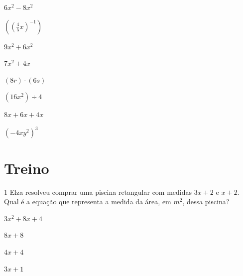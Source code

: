 \begin{multicols}{2}
\begin{escolha}[itemsep=0pt,leftmargin=0pt]
\item $6x^2 - 8x^2$
\item $((\frac{4}{5}x)^{-1})$
\item $9x^2 + 6x^2$
\item $7x^2 + 4x$
\item $(8r) \cdot (6s)$
\item $(16x^2) \div 4$
\item $8x + 6x + 4x$
\item $(-4xy^2)^3$
\end{escolha}
\end{multicols}


\section*{Treino}

\num{1} Elza resolveu comprar uma piscina retangular com medidas $3x + 2$ e $x + 2$.
Qual é a equação que representa a medida da área, em $m^2$, dessa piscina?

\begin{escolha}[itemsep=0pt]
\item $3x^2 + 8x + 4$
\item $8x + 8$
\item $4x + 4$
\item $3x + 1$
\end{escolha}

